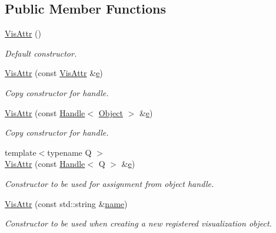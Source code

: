 \subsection*{Public Member Functions}
\begin{DoxyCompactItemize}
\item 
\hyperlink{class_d_d4hep_1_1_geometry_1_1_vis_attr_acfba4fd373c7595e64e5a88069646d09}{Vis\+Attr} ()
\begin{DoxyCompactList}\small\item\em Default constructor. \end{DoxyCompactList}\item 
\hyperlink{class_d_d4hep_1_1_geometry_1_1_vis_attr_ab2085f9fc993fb7e83b4ba3430e6216e}{Vis\+Attr} (const \hyperlink{class_d_d4hep_1_1_geometry_1_1_vis_attr}{Vis\+Attr} \&\hyperlink{_volumes_8cpp_a8a9a1f93e9b09afccaec215310e64142}{e})
\begin{DoxyCompactList}\small\item\em Copy constructor for handle. \end{DoxyCompactList}\item 
\hyperlink{class_d_d4hep_1_1_geometry_1_1_vis_attr_a2e977728c8f627c4b5dea219d2353fda}{Vis\+Attr} (const \hyperlink{class_d_d4hep_1_1_handle}{Handle}$<$ \hyperlink{class_d_d4hep_1_1_geometry_1_1_vis_attr_a8c2a1708a4161f27aed36d464be316cc}{Object} $>$ \&\hyperlink{_volumes_8cpp_a8a9a1f93e9b09afccaec215310e64142}{e})
\begin{DoxyCompactList}\small\item\em Copy constructor for handle. \end{DoxyCompactList}\item 
{\footnotesize template$<$typename Q $>$ }\\\hyperlink{class_d_d4hep_1_1_geometry_1_1_vis_attr_a248f9c0219a5d5ec6c1fa491dac15b02}{Vis\+Attr} (const \hyperlink{class_d_d4hep_1_1_handle}{Handle}$<$ Q $>$ \&\hyperlink{_volumes_8cpp_a8a9a1f93e9b09afccaec215310e64142}{e})
\begin{DoxyCompactList}\small\item\em Constructor to be used for assignment from object handle. \end{DoxyCompactList}\item 
\hyperlink{class_d_d4hep_1_1_geometry_1_1_vis_attr_a2f0da398224287451179272dbbb3c1d9}{Vis\+Attr} (const std\+::string \&\hyperlink{class_d_d4hep_1_1_handle_a27c7d467a609ab32c133e1f3c7d85ef5}{name})
\begin{DoxyCompactList}\small\item\em Constructor to be used when creating a new registered visualization object. \end{DoxyCompactList}\item 

\end{DoxyCompactItemize}
